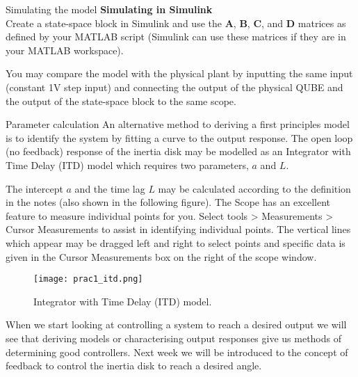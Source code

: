 \documentclass[9pt]{beamer-control}
\begin{document}
\begin{frame}{Simulating the model}
\textbf{Simulating in Simulink}\\
Create a state-space block in Simulink and use the $\mathbf{A}$, $\mathbf{B}$, $\mathbf{C}$, and $\mathbf{D}$ matrices as defined by your MATLAB script (Simulink can use these matrices if they are in your MATLAB workspace). 

You may compare the  model with the physical plant by inputting the same input (constant 1V step input) and connecting the output of the physical QUBE and the output of the state-space block to the same scope.
\end{frame}





\begin{frame}{Parameter calculation}
An alternative method to deriving a first principles model is to identify the system by fitting a curve to the output response. The open loop (no feedback) response of the inertia disk may be modelled as an Integrator with Time Delay (ITD) model which requires two parameters, $a$ and $L$.
	
The intercept $a$ and the time lag $L$ may be calculated according to the definition in the notes (also shown in the following figure). The Scope has an excellent feature to measure individual points for you. Select tools > Measurements > Cursor Measurements to assist in identifying individual points. The vertical lines which appear may be dragged left and right to select points and specific data is given in the Cursor Measurements box on the right of the scope window.
\end{frame}

\begin{frame}
	\begin{figure}
		\centering
		\texttt{[image: prac1\_itd.png]}
		\caption{Integrator with Time Delay (ITD) model.}
	\end{figure}
\end{frame}

\begin{frame}
	When we start looking at controlling a system to reach a desired output we will see that deriving models or characterising output responses give us methods of determining good controllers. Next week we will be introduced to the concept of feedback to control the inertia disk to reach a desired angle. 
\end{frame}




\SUMMARYFRAME
\end{document}
